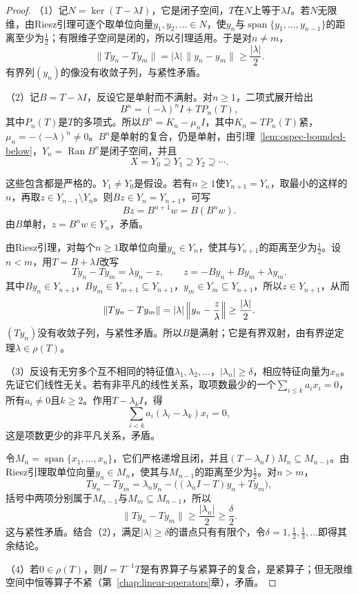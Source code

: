 \begin{proof}
（1）记$N=\ker(T-\lambda I)$，它是闭子空间，$T$在$N$上等于$\lambda I$。若$N$无限维，由Riesz引理可逐个取单位向量$y_1,y_2,\ldots\in N$，使$y_n$与$\operatorname{span}\{y_1,\ldots,y_{n-1}\}$的距离至少为$\frac12$；有限维子空间是闭的，所以引理适用。于是对$n\neq m$，
\[
\lVert Ty_n-Ty_m\rVert=\lvert\lambda\rvert\,\lVert y_n-y_m\rVert\geq\frac{\lvert\lambda\rvert}{2}.
\]
有界列$(y_n)$的像没有收敛子列，与紧性矛盾。

（2）记$B=T-\lambda I$，反设它是单射而不满射。对$n\geq1$，二项式展开给出
\[
B^n=(-\lambda)^nI+TP_n(T),
\]
其中$P_n(T)$是$T$的多项式。所以$B^n=K_n-\mu_nI$，其中$K_n=TP_n(T)$紧，$\mu_n=-(-\lambda)^n\neq0$。$B^n$是单射的复合，仍是单射，由引理~\ref{lem:ospec-bounded-below}，$Y_n=\operatorname{Ran}B^n$是闭子空间，并且
\[
X=Y_0\supseteq Y_1\supseteq Y_2\supseteq\cdots.
\]

这些包含都是严格的。$Y_1\neq Y_0$是假设。若有$n\geq1$使$Y_{n+1}=Y_n$，取最小的这样的$n$，再取$z\in Y_{n-1}\setminus Y_n$。则$Bz\in Y_n=Y_{n+1}$，可写
\[
Bz=B^{n+1}w=B(B^nw).
\]
由$B$单射，$z=B^nw\in Y_n$，矛盾。

由Riesz引理，对每个$n\geq1$取单位向量$y_n\in Y_n$，使其与$Y_{n+1}$的距离至少为$\frac12$。设$n<m$，用$T=B+\lambda I$改写
\[
Ty_n-Ty_m=\lambda y_n-z,\qquad z=-By_n+By_m+\lambda y_m .
\]
其中$By_n\in Y_{n+1}$，$By_m\in Y_{m+1}\subseteq Y_{n+1}$，$y_m\in Y_m\subseteq Y_{n+1}$，所以$z\in Y_{n+1}$，从而
\[
\lVert Ty_n-Ty_m\rVert=\lvert\lambda\rvert\,\Bigl\lVert y_n-\frac{z}{\lambda}\Bigr\rVert\geq\frac{\lvert\lambda\rvert}{2}.
\]
$(Ty_n)$没有收敛子列，与紧性矛盾。所以$B$是满射；它是有界双射，由有界逆定理$\lambda\in\rho(T)$。

（3）反设有无穷多个互不相同的特征值$\lambda_1,\lambda_2,\ldots$，$\lvert\lambda_n\rvert\geq\delta$，相应特征向量为$x_n$。先证它们线性无关。若有非平凡的线性关系，取项数最少的一个$\sum_{i\leq k}a_ix_i=0$，所有$a_i\neq0$且$k\geq2$。作用$T-\lambda_kI$，得
\[
\sum_{i<k}a_i(\lambda_i-\lambda_k)x_i=0,
\]
这是项数更少的非平凡关系，矛盾。

令$M_n=\operatorname{span}\{x_1,\ldots,x_n\}$，它们严格递增且闭，并且$(T-\lambda_nI)M_n\subseteq M_{n-1}$。由Riesz引理取单位向量$y_n\in M_n$，使其与$M_{n-1}$的距离至少为$\frac12$。对$n>m$，
\[
Ty_n-Ty_m=\lambda_ny_n-\bigl((\lambda_nI-T)y_n+Ty_m\bigr),
\]
括号中两项分别属于$M_{n-1}$与$M_m\subseteq M_{n-1}$，所以
\[
\lVert Ty_n-Ty_m\rVert\geq\frac{\lvert\lambda_n\rvert}{2}\geq\frac\delta2.
\]
这与紧性矛盾。结合（2），满足$\lvert\lambda\rvert\geq\delta$的谱点只有有限个，令$\delta=1,\frac12,\frac13,\ldots$即得其余结论。

（4）若$0\in\rho(T)$，则$I=T^{-1}T$是有界算子与紧算子的复合，是紧算子；但无限维空间中恒等算子不紧（第~\ref{chap:linear-operators}章），矛盾。
\end{proof}

